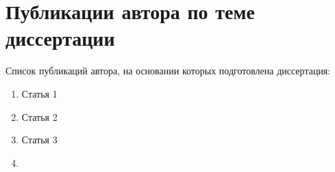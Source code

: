 \chapter*{Публикации автора по теме диссертации}
Список публикаций автора, на основании которых подготовлена диссертация:

\begin{enumerate}[label=\Roman*., leftmargin=\parindent, align=left]
	\item Статья 1
	\item Статья 2
	\item Статья 3
	\item
\end{enumerate}
	